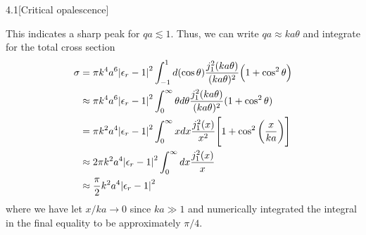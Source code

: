 \documentclass[12pt]{article}
\begin{document}
\begin{problem}{4.1}[Critical opalescence]
\begin{solution}
\begin{center}
\end{center}
This indicates a sharp peak for $qa\lesssim1$. Thus, we can write $qa\approx
ka\theta$ and integrate for the total cross section
\begin{align}
    \sigma
    &=\pi k^4a^6\abs{\epsilon_r-1}^2\int_{-1}^1d(\cos\theta)
    \frac{j_1^2(ka\theta)}{(ka\theta)^2}\qty(1+\cos^2\theta)\notag\\
    &\approx\pi k^4a^6\abs{\epsilon_r-1}^2\int_0^\infty\theta d\theta
    \frac{j_1^2(ka\theta)}{(ka\theta)^2}(1+\cos^2\theta)\notag\\
    &=\pi k^2a^4\abs{\epsilon_r-1}^2\int_0^\infty
    xdx\frac{j_1^2(x)}{x^2}\qty[1+\cos^2\qty(\frac{x}{ka})]\notag\\
    &\approx 2\pi k^2a^4\abs{\epsilon_r-1}^2\int_0^\infty
    dx\frac{j_1^2(x)}{x}\notag\\
    &\approx\frac{\pi}{2}k^2a^4\abs{\epsilon_r-1}^2
\end{align}
where we have let $x/ka\to0$ since $ka\gg 1$ and numerically integrated the
integral in the final equality to be approximately $\pi/4$.
\end{solution}
\end{problem}
\newpage
\end{document}
